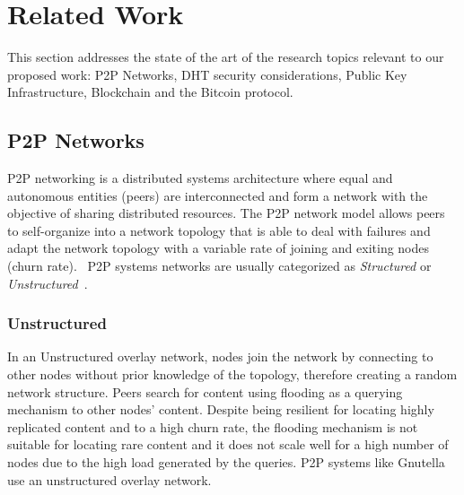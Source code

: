 \chapter{Related Work}
\label{chapter:relatedwork}
This section addresses the state of the art of the research topics relevant to our proposed work: P2P Networks, DHT security considerations, Public Key Infrastructure, Blockchain and the Bitcoin protocol.

\section{P2P Networks}

\ac{P2P} networking is a distributed systems architecture where equal and autonomous entities (peers) are interconnected and form a network with the objective of sharing distributed resources.
The \ac{P2P} network model allows peers to self-organize into a network topology that is able to deal with failures and adapt the network topology with a variable rate of joining and exiting nodes (churn rate).~\cite{GuptaA11}
\ac{P2P} systems networks are usually categorized as \textit{Structured} or \textit{Unstructured}~\cite{Lua2005}.

\subsection{Unstructured} In an Unstructured overlay network, nodes join the network by connecting to other nodes without prior knowledge of the topology, therefore creating a random network structure.
Peers search for content using flooding as a querying mechanism to other nodes' content.
Despite being resilient for locating highly replicated content and to a high churn rate, the flooding mechanism is not suitable for locating rare content and it does not scale well for a high number of nodes due to the high load generated by the queries.
\ac{P2P} systems like Gnutella\cite{gnutella} use an unstructured overlay network.

